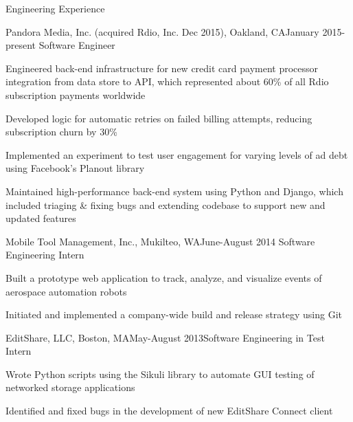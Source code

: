 \documentclass{resume} %
\begin{document}

\begin{rSection}{Engineering Experience}

\begin{rSubsection}{Pandora Media, Inc. (acquired Rdio, Inc. Dec 2015), Oakland, CA}{January 2015-present} {Software Engineer}

\item Engineered back-end infrastructure for new credit card payment processor integration from data store to API, which represented about 60\% of all Rdio subscription payments worldwide
\item Developed logic for automatic retries on failed billing attempts, reducing subscription churn by 30\%
\item Implemented an experiment to test user engagement for varying levels of ad debt using Facebook's Planout library
\item Maintained high-performance back-end system using Python and Django, which included triaging \& fixing bugs and extending codebase to support new and updated features
\end{rSubsection}

\begin{rSubsection}{Mobile Tool Management, Inc., Mukilteo, WA}{June-August 2014} {Software Engineering Intern}

\item Built a prototype web application to track, analyze, and visualize events of aerospace automation robots
\item Initiated and implemented a company-wide build and release strategy using Git
\end{rSubsection}


\begin{rSubsection}{EditShare, LLC, Boston, MA}{May-August 2013}{Software Engineering in Test Intern}{}
\item Wrote Python scripts using the Sikuli library to automate GUI testing of networked storage applications
\item Identified and fixed bugs in the development of new EditShare Connect client
\end{rSubsection}

\end{rSection}
\end{document}
